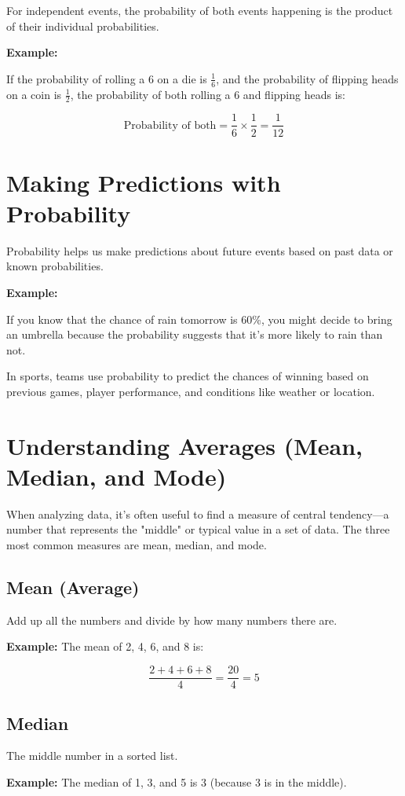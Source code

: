 For independent events, the probability of both events happening is the product of their individual probabilities.

\textbf{Example:}

If the probability of rolling a 6 on a die is $\frac{1}{6}$, and the probability of flipping heads on a coin is $\frac{1}{2}$, the probability of both rolling a 6 and flipping heads is:

\[
\text{Probability of both} = \frac{1}{6} \times \frac{1}{2} = \frac{1}{12}
\]

\section{Making Predictions with Probability}
Probability helps us make predictions about future events based on past data or known probabilities.

\textbf{Example:}

If you know that the chance of rain tomorrow is 60\%, you might decide to bring an umbrella because the probability suggests that it’s more likely to rain than not.

In sports, teams use probability to predict the chances of winning based on previous games, player performance, and conditions like weather or location.

\section{Understanding Averages (Mean, Median, and Mode)}
When analyzing data, it’s often useful to find a measure of central tendency—a number that represents the "middle" or typical value in a set of data. The three most common measures are mean, median, and mode.

\subsection{Mean (Average)}
Add up all the numbers and divide by how many numbers there are.

\textbf{Example:} The mean of 2, 4, 6, and 8 is:

\[
\frac{2 + 4 + 6 + 8}{4} = \frac{20}{4} = 5
\]

\subsection{Median}
The middle number in a sorted list.

\textbf{Example:} The median of 1, 3, and 5 is 3 (because 3 is in the middle).

